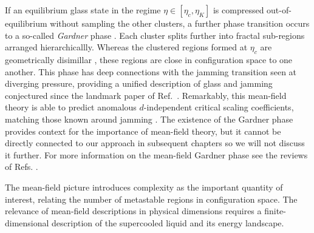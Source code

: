 \documentclass[11pt,twoside]{report}
\begin{document}
If an equilibrium glass state in the regime $\eta \in [\eta_c, \eta_K]$ is compressed out-of-equilibrium without sampling the other clusters, a further phase transition occurs to a so-called \emph{Gardner} phase \cite{KurchanJPCB2013,CharbonneauNC2014,CharbonneauJSM2014}.
Each cluster splits further into fractal sub-regions arranged hierarchicallly.
Whereas the clustered regions formed at $\eta_c$ are geometrically disimillar%
,
these regions are close in configuration space to one another.
This phase has deep connections with the jamming transition seen at diverging pressure, providing a unified description of glass and jamming conjectured since the landmark paper of Ref.\ \cite{LiuN1998}.
Remarkably, this mean-field theory is able to predict anomalous $d$-independent critical scaling coefficients, matching those known around jamming \cite{WyartPRL2012,LernerSM2013,DeGiuliPNAS2014}.
The existence of the Gardner phase provides context for the importance of mean-field theory, but it cannot be directly connected to our approach in subsequent chapters so we will not discuss it further.
For more information on the mean-field Gardner phase see the reviews of Refs. \cite{BerthierJCP2019,CharbonneauARCMP2017}.


The mean-field picture introduces complexity as the important quantity of interest, relating the number of metastable regions in configuration space.
The relevance of mean-field descriptions in physical dimensions requires a finite-dimensional description of the supercooled liquid and its energy landscape.


\end{document}
